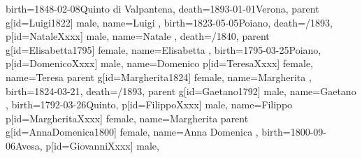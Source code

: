 \documentclass{article}
\begin{document}
\begin{midpage}
\begin{center}
\begin{genealogypicture}
{{{{{{                        birth={1848-02-08}{Quinto di Valpantena},
                        death={1893-01-01}{Verona},
                    }
                    parent{
                        g[id=Luigi1822]{
                            male,
                            name={Luigi },
                            birth={1823-05-05}{Poiano},
                            death={/1893}{},
                        }
                        p[id=NataleXxxx]{
                            male,
                            name={Natale },
                            death={/1840}{},
                        }
                        parent{
                            g[id=Elisabetta1795]{
                                female,
                                name={Elisabetta },
                                birth={1795-03-25}{Poiano},
                            }
                            p[id=DomenicoXxxx]{
                                male,
                                name={Domenico }
                            }
                            p[id=TeresaXxxx]{
                                female,
                                name={Teresa }
                            }
                        }
                    }
                    parent{
                        g[id=Margherita1824]{
                            female,
                            name={Margherita },
                            birth={1824-03-21}{},
                            death={/1893}{},
                        }
                        parent{
                            g[id=Gaetano1792]{
                                male,
                                name={Gaetano },
                                birth={1792-03-26}{Quinto},
                            }
                            p[id=FilippoXxxx]{
                                male,
                                name={Filippo }
                            }
                            p[id=MargheritaXxxx]{
                                female,
                                name={Margherita}
                            }
                        }
                        parent{
                            g[id=AnnaDomenica1800]{
                                female,
                                name={Anna Domenica },
                                birth={1800-09-06}{Avesa},
                            }
                            p[id=GiovanniXxxx]{
                                male,
}}}}}}}}
\end{genealogypicture}
\end{center}
\end{midpage}
\end{document}
